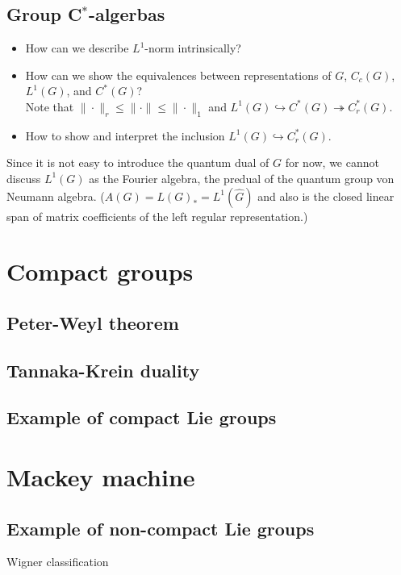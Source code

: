 \documentclass{../../large}
\begin{document}
\section{Group C$^*$-algerbas}

\begin{itemize}
\item How can we describe $L^1$-norm intrinsically?
\item How can we show the equivalences between representations of $G$, $C_c(G)$, $L^1(G)$, and $C^*(G)$?\\Note that $\|\cdot\|_r\le\|\cdot\|\le\|\cdot\|_1$ and $L^1(G)\hookrightarrow C^*(G)\twoheadrightarrow C^*_r(G)$.
\item How to show and interpret the inclusion $L^1(G)\hookrightarrow C^*_r(G)$.
\end{itemize}


Since it is not easy to introduce the quantum dual of $G$ for now, we cannot discuss $L^1(G)$ as the Fourier algebra, the predual of the quantum group von Neumann algebra.
($A(G)=L(G)_*=L^1(\hat G)$ and also is the closed linear span of matrix coefficients of the left regular representation.)



\chapter{Compact groups}
\section{Peter-Weyl theorem}
\section{Tannaka-Krein duality}
\section{Example of compact Lie groups}

\chapter{Mackey machine}
\section{Example of non-compact Lie groups}
Wigner classification
\end{document}
